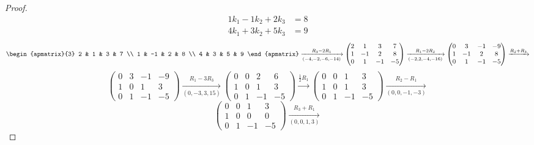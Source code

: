 \documentclass{article}
\begin{document}
\begin{enumerate}
\begin{proof}
\begin{align*}
            1k_1 - 1k_2 + 2k_3 & = 8 \\
            4k_1 + 3k_2 + 5k_3 & = 9
        \end{align*}
        \[
            \begin{apmatrix}{3}
                2 & 1 & 3 & 7 \\
                1 & -1 & 2 & 8 \\
                4 & 3 & 5 & 9
            \end{apmatrix} \xrightarrow[(-4,-2,-6,-14)]{R_3 - 2R_1}
            \begin{pmatrix}
                2 & 1  & 3  & 7  \\
                1 & -1 & 2  & 8  \\
                0 & 1  & -1 & -5
            \end{pmatrix} \xrightarrow[(-2,2,-4,-16)]{R_1 - 2R_2}
            \begin{pmatrix}
                0 & 3  & -1 & -9 \\
                1 & -1 & 2  & 8  \\
                0 & 1  & -1 & -5
            \end{pmatrix} \xrightarrow{R_2 + R_3}
        \]
        \[
            \begin{pmatrix}
                0 & 3 & -1 & -9 \\
                1 & 0 & 1  & 3  \\
                0 & 1 & -1 & -5
            \end{pmatrix} \xrightarrow[(0,-3,3,15)]{R_1 - 3R_3}
            \begin{pmatrix}
                0 & 0 & 2  & 6  \\
                1 & 0 & 1  & 3  \\
                0 & 1 & -1 & -5
            \end{pmatrix} \xrightarrow{\frac{1}{2}R_1}
            \begin{pmatrix}
                0 & 0 & 1  & 3  \\
                1 & 0 & 1  & 3  \\
                0 & 1 & -1 & -5
            \end{pmatrix} \xrightarrow[(0,0,-1,-3)]{R_2 - R_1}
        \]
        \[
            \begin{pmatrix}
                0 & 0 & 1  & 3  \\
                1 & 0 & 0  & 0  \\
                0 & 1 & -1 & -5
            \end{pmatrix} \xrightarrow[(0,0,1,3)]{R_3 + R_1}
\]
\end{proof}
\end{enumerate}
\end{document}
